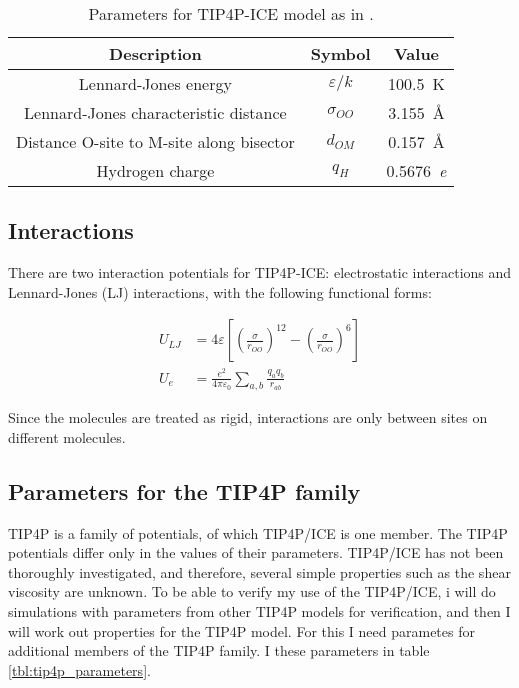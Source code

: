 \begin{table}[h!tb]
\caption{Parameters for TIP4P-ICE model as in \cite{Abascal2005}.}
\begin{center}
\begin{tabular}{c|c|c}
Description & Symbol & Value \\ 
\hline
Lennard-Jones energy & $\varepsilon/k$ & \SI{100.5}{\kelvin} \\
Lennard-Jones characteristic distance & $\sigma_{OO}$ & \SI{3.155}{\angstrom} \\
Distance O-site to M-site along bisector & $d_{OM}$ & \SI{0.157}{\angstrom} \\
Hydrogen charge & $q_H$ & \SI{0.5676}{\elementarycharge} \\
\end{tabular}
\end{center}
\end{table}

\subsection{Interactions}
There are two interaction potentials for TIP4P-ICE: electrostatic interactions and Lennard-Jones (LJ) interactions, with the following functional forms:

\begin{align}
	U_{LJ} & = 4\varepsilon\left[\left(\frac{\sigma}{r_{OO}}\right)^{12} - \left(\frac{\sigma}{r_{OO}}\right)^{6}\right]
	\label{eq:part1:lennardjonespotential}
	\\
	U_{\si{\elementarycharge}} & = \frac{\si{\elementarycharge\squared}}{4\pi\varepsilon_0} \sum_{a, b} \frac{q_aq_b}{r_{ab}}
	\label{eq:part1:electrostaticpotential}
\end{align}

Since the molecules are treated as rigid, interactions are only between sites on different molecules. 

\subsection{Parameters for the TIP4P family}
TIP4P is a family of potentials, of which TIP4P/ICE is one member. The TIP4P potentials differ only in the values of their parameters. TIP4P/ICE has not been thoroughly investigated, and therefore, several simple properties such as the shear viscosity are unknown. To be able to verify my use of the TIP4P/ICE, i will do simulations with parameters from other TIP4P models for verification, and then I will work out properties for the TIP4P model. For this I need parametes for additional members of the TIP4P family. I these parameters in table \ref{tbl:tip4p_parameters}.

